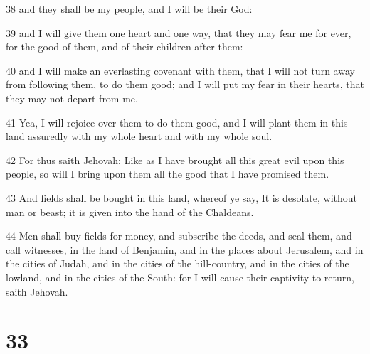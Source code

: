\par 38 and they shall be my people, and I will be their God:
\par 39 and I will give them one heart and one way, that they may fear me for ever, for the good of them, and of their children after them:
\par 40 and I will make an everlasting covenant with them, that I will not turn away from following them, to do them good; and I will put my fear in their hearts, that they may not depart from me.
\par 41 Yea, I will rejoice over them to do them good, and I will plant them in this land assuredly with my whole heart and with my whole soul.
\par 42 For thus saith Jehovah: Like as I have brought all this great evil upon this people, so will I bring upon them all the good that I have promised them.
\par 43 And fields shall be bought in this land, whereof ye say, It is desolate, without man or beast; it is given into the hand of the Chaldeans.
\par 44 Men shall buy fields for money, and subscribe the deeds, and seal them, and call witnesses, in the land of Benjamin, and in the places about Jerusalem, and in the cities of Judah, and in the cities of the hill-country, and in the cities of the lowland, and in the cities of the South: for I will cause their captivity to return, saith Jehovah.

\chapter{33}

